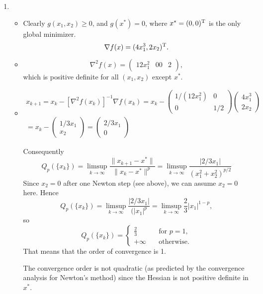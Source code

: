 \begin{enumerate}
  \item
\begin{itemize}
\item Clearly $g(x_1, x_2)\ge 0$, and $g(x^*)=0$, where $x^*=(0,0)^{\text{\upshape T}}$ is the only global minimizer.
\[
\nabla f(x) = ( 4x_1^3, 2x_2)^{\text{\upshape T}}.
\]

\item
\[
\nabla^2 f(x) =
\begin{pmatrix}
12 x_1^2 & 0
0 & 2
\end{pmatrix},
\]
which is positive definite for all $(x_1, x_2)$ except $x^*$.

\item
\begin{multline*}
x_{k+1}
= x_k - [\nabla^2 f(x_k)]^{-1} \nabla f(x_k)
= x_k -
\begin{pmatrix}
1/(12 x_1^2) & 0\\
0 & 1/2
\end{pmatrix}
\begin{pmatrix}
4 x_1^3\\
2 x_2
\end{pmatrix}\\
= x_k -
\begin{pmatrix}
1/3 x_1\\
x_2
\end{pmatrix}
=
\begin{pmatrix}
2/3 x_1\\
0
\end{pmatrix}
\end{multline*}

Consequently
\[
Q_p(\{x_k\})
= \limsup_{k\to\infty} \frac{\|x_{k+1}-x^*\|}{\|x_k-x^*\|^p}
= \limsup_{k\to\infty} \frac{|2/3 x_1|}{(x_1^2+x_2^2)^{p/2}}
\]
Since $x_2=0$ after one Newton step (see above), we can assume $x_2=0$ here.
Hence
\[
Q_p(\{x_k\})
= \limsup_{k\to\infty} \frac{|2/3 x_1|}{(|x_1|^p}
= \limsup_{k\to\infty} \frac{2}{3} |x_1|^{1-p},
\]
so
\[
Q_p(\{x_k\})
=
\begin{cases}
\tfrac{2}{3} \quad&\text{for } p=1,\\
+\infty \quad&\text{otherwise.}
\end{cases}
\]
That means that the order of convergence is 1.

The convergence order is not quadratic (as predicted by the convergence
analysis for Newton's method) since the Hessian is not positive definite in
$x^*$.

\end{itemize}
\end{enumerate}
